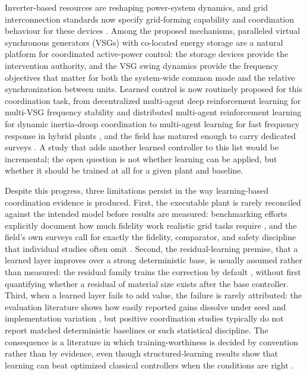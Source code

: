 \documentclass[journal]{IEEEtran}
\begin{document}
Inverter-based resources are reshaping power-system dynamics, and grid interconnection standards now specify grid-forming capability and coordination behaviour for these devices \cite{ieee2800,nerc2023grid,unifi2024specifications}. Among the proposed mechanisms, paralleled virtual synchronous generators (VSGs) with co-located energy storage are a natural platform for coordinated active-power control: the storage devices provide the intervention authority, and the VSG swing dynamics provide the frequency objectives that matter for both the system-wide common mode and the relative synchronization between units. Learned control is now routinely proposed for this coordination task, from decentralized multi-agent deep reinforcement learning for multi-VSG frequency stability \cite{kang2025enhancing} and distributed multi-agent reinforcement learning for dynamic inertia-droop coordination \cite{yang2023distributed} to multi-agent learning for fast frequency response in hybrid plants \cite{ikram2026novel}, and the field has matured enough to carry dedicated surveys \cite{ding2024deep}. A study that adds another learned controller to this list would be incremental; the open question is not whether learning can be applied, but whether it should be trained at all for a given plant and baseline.

Despite this progress, three limitations persist in the way learning-based coordination evidence is produced. First, the executable plant is rarely reconciled against the intended model before results are measured: benchmarking efforts explicitly document how much fidelity work realistic grid tasks require \cite{marchesini2025rl2grid}, and the field's own surveys call for exactly the fidelity, comparator, and safety discipline that individual studies often omit \cite{yu2025safe,glover2025deep}. Second, the residual-learning premise, that a learned layer improves over a strong deterministic base, is usually assumed rather than measured: the residual family trains the correction by default \cite{liu2025residual,johannink2019residual,silver2018residual}, without first quantifying whether a residual of material size exists after the base controller. Third, when a learned layer fails to add value, the failure is rarely attributed: the evaluation literature shows how easily reported gains dissolve under seed and implementation variation \cite{henderson2018deep,agarwal2021deep}, but positive coordination studies typically do not report matched deterministic baselines or such statistical discipline. The consequence is a literature in which training-worthiness is decided by convention rather than by evidence, even though structured-learning results show that learning can beat optimized classical controllers when the conditions are right \cite{cui2023reinforcement}.
\end{document}
